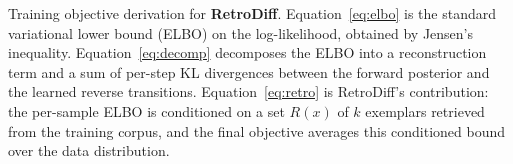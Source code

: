 \caption{Training objective derivation for \textbf{RetroDiff}.
Equation~\eqref{eq:elbo} is the standard variational lower bound (ELBO) on the log-likelihood,
obtained by Jensen's inequality.
Equation~\eqref{eq:decomp} decomposes the ELBO into a reconstruction term and a sum of
per-step KL divergences between the forward posterior and the learned reverse transitions.
Equation~\eqref{eq:retro} is RetroDiff's contribution: the per-sample ELBO is conditioned on
a set $R(x)$ of $k$ exemplars retrieved from the training corpus, and the final objective
averages this conditioned bound over the data distribution.}
